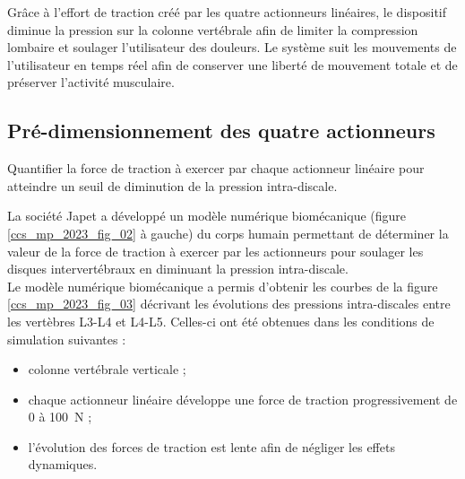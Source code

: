 Grâce à l'effort de traction créé par les quatre actionneurs linéaires, le dispositif diminue la pression sur la colonne vertébrale afin de limiter la compression lombaire et soulager l'utilisateur des douleurs. Le système suit les mouvements de l'utilisateur en temps réel afin de conserver une liberté de mouvement totale et de préserver l'activité musculaire.

\subsection{Pré-dimensionnement des quatre actionneurs} %
\begin{obj}
Quantifier la force de traction à exercer par chaque actionneur linéaire pour atteindre un seuil de diminution de la pression intra-discale.
\end{obj}

La société Japet a développé un modèle numérique biomécanique (figure \ref{ccs_mp_2023_fig_02} à gauche) du corps humain permettant de déterminer la valeur de la force de traction à exercer par les actionneurs pour soulager les disques intervertébraux en diminuant la pression intra-discale.\\
Le modèle numérique biomécanique a permis d'obtenir les courbes de la figure \ref{ccs_mp_2023_fig_03} décrivant les évolutions des pressions intra-discales entre les vertèbres L3-L4 et L4-L5. Celles-ci ont été obtenues dans les conditions de simulation suivantes :

\begin{itemize}
  \item colonne vertébrale verticale ;
  \item chaque actionneur linéaire développe une force de traction progressivement de 0 à \SI{100}{N} ;
  \item l'évolution des forces de traction est lente afin de négliger les effets dynamiques.
\end{itemize}

\ifprof
\begin{corrige}
\end{corrige}
\else
\fi


